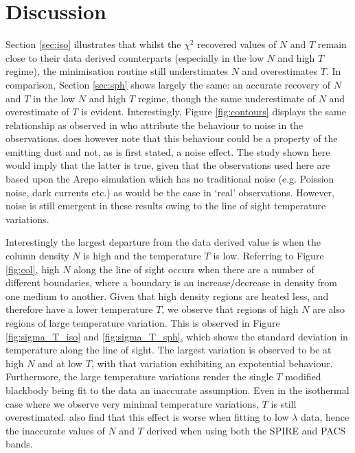 \documentclass{report}
\begin{document}
\chapter{Discussion}
Section \ref{sec:iso} illustrates that whilst the $\chi^{2}$ recovered values of $N$ and $T$ remain close to their data derived counterparts (especially in the low $N$ and high $T$ regime), the minimisation routine still understimates $N$ and overestimates $T$. In comparison, Section \ref{sec:sph} shows largely the same: an accurate recovery of $N$ and $T$ in the low $N$ and high $T$ regime, though the same underestimate of $N$ and overestimate of $T$ is evident. Interestingly, Figure \ref{fig:contours} displays the same relationship as observed in \textcite{noise,noiseb} who attribute the behaviour to noise in the observations. \textcite{noise,noiseb} does however note that this behaviour could be a property of the emitting dust and not, as is first stated, a noise effect. The study shown here would imply that the latter is true, given that the observations used here are based upon the Arepo simulation which has no traditional noise (e.g. Poission noise, dark currents etc.) as would be the case in `real' observations. However, noise is still emergent in these results owing to the line of sight temperature variations.

Interestingly the largest departure from the data derived value is when the column density $N$ is high and the temperature $T$ is low. Referring to Figure \ref{fig:col}, high $N$ along the line of sight occurs when there are a number of different boundaries, where a boundary is an increase/decrease in density from one medium to another. Given that high density regions are heated less, and therefore have a lower temperature $T$, we observe that regions of high $N$ are also regions of large temperature variation. This is observed in Figure \ref{fig:sigma_T_iso} and \ref{fig:sigma_T_sph}, which shows the standard deviation in temperature along the line of sight. The largest variation is observed to be at high $N$ and at low $T$, with that variation exhibiting an expotential behaviour. Furthermore, the large temperature variations render the single $T$ modified blackbody being fit to the data an inaccurate assumption. Even in the isothermal case where we observe very minimal temperature variations, $T$ is still overestimated. \textcite{noise,noiseb} also find that this effect is worse when fitting to low $\lambda$ data, hence the inaccurate values of $N$ and $T$ derived when using both the SPIRE and PACS bands.
\end{document}
